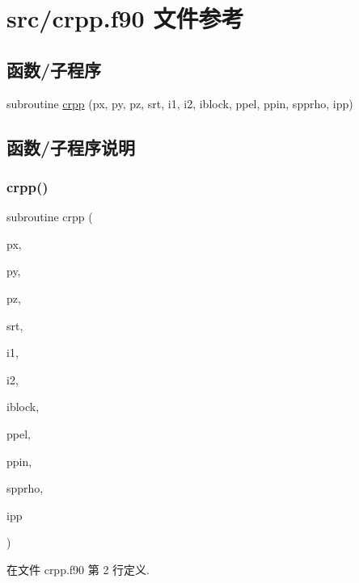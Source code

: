 \hypertarget{crpp_8f90}{}\section{src/crpp.f90 文件参考}
\label{crpp_8f90}
\subsection*{函数/子程序}
\begin{DoxyCompactItemize}
\item 
subroutine \mbox{\hyperlink{crpp_8f90_aed3e2ac464334a43a5b6604c7ad62885}{crpp}} (px, py, pz, srt, i1, i2, iblock, ppel, ppin, spprho, ipp)
\end{DoxyCompactItemize}


\subsection{函数/子程序说明}
\mbox{\label{crpp_8f90_aed3e2ac464334a43a5b6604c7ad62885}} 
\subsubsection{\texorpdfstring{crpp()}{crpp()}}
{\footnotesize\ttfamily subroutine crpp (\begin{DoxyParamCaption}\item[{}]{px,  }\item[{}]{py,  }\item[{}]{pz,  }\item[{}]{srt,  }\item[{}]{i1,  }\item[{}]{i2,  }\item[{}]{iblock,  }\item[{}]{ppel,  }\item[{}]{ppin,  }\item[{}]{spprho,  }\item[{}]{ipp }\end{DoxyParamCaption})}



在文件 crpp.\+f90 第 2 行定义.

